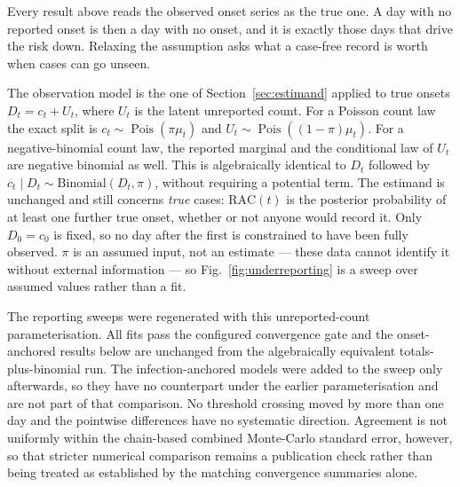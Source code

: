 \documentclass[11pt,a4paper]{article}
\theoremstyle{plain}
\theoremstyle{definition}
\newcommand{\Binom}{\mathrm{Binomial}}
\newcommand{\RAC}{\mathrm{RAC}}
\begin{document}
Every result above reads the observed onset series as the true one. A day with no reported onset
is then a day with no onset, and it is exactly those days that drive the risk down. Relaxing the
assumption asks what a case-free record is worth when cases can go unseen.

The observation model is the one of Section~\ref{sec:estimand} applied to true onsets
$D_t=c_t+U_t$, where $U_t$ is the latent unreported count. For a Poisson count law the exact
split is $c_t\sim\operatorname{Pois}(\pi\mu_t)$ and
$U_t\sim\operatorname{Pois}((1-\pi)\mu_t)$. For a negative-binomial
count law, the reported marginal and the conditional law of $U_t$ are negative binomial as well.
This is algebraically identical to $D_t$ followed by $c_t\mid D_t\sim\Binom(D_t,\pi)$, without
requiring a potential term. The estimand is unchanged and still
concerns \emph{true} cases: $\RAC(t)$ is the posterior probability of at least one further true
onset, whether or not anyone would record it. Only $D_0=c_0$ is fixed, so no day after the first
is constrained to have been fully observed. $\pi$ is an assumed input, not an estimate --- these
data cannot identify it without external information --- so Fig.~\ref{fig:underreporting} is a
sweep over assumed values rather than a fit.

The reporting sweeps were regenerated with this unreported-count parameterisation. All fits pass
the configured convergence gate and the onset-anchored results below are unchanged from the
algebraically equivalent totals-plus-binomial run. The infection-anchored models were added to
the sweep only afterwards, so they have no counterpart under the earlier parameterisation and
are not part of that comparison. No threshold crossing moved by more than one
day and the pointwise differences have no systematic direction. Agreement is not uniformly
within the chain-based combined Monte-Carlo standard error, however, so that stricter numerical
comparison remains a publication check rather than being treated as established by the matching
convergence summaries alone.
\end{document}
